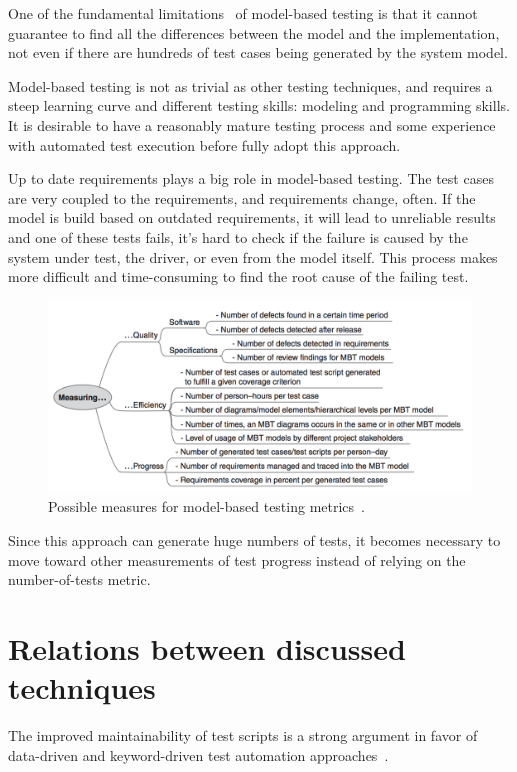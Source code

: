 One of the fundamental limitations~\cite{1200168} of model-based testing is that it cannot guarantee to find all the differences between the model and the implementation, not even if there are hundreds of test cases being generated by the system model.

Model-based testing is not as trivial as other testing techniques, and requires a steep learning curve and different testing skills: modeling and programming skills. It is desirable to have a reasonably mature testing process and some experience with automated test execution before fully adopt this approach.

Up to date requirements plays a big role in model-based testing. The test cases are very coupled to the requirements, and requirements change, often. If the model is build based on outdated requirements, it will lead to unreliable results and one of these tests fails, it's hard to check if the failure is caused by the system under test, the driver, or even from the model itself. This process makes more difficult and time-consuming to find the root cause of the failing test.

\begin{figure}[!htb]
\centering
\includegraphics[scale=0.5]{metrics.png}
\caption{Possible measures for model-based testing metrics~\cite{Kramer2016}.} \label{fig:metrics}
\end{figure}

Since this approach can generate huge numbers of tests, it becomes necessary to move toward other measurements of test progress instead of relying on the number-of-tests metric.

\section{Relations between discussed techniques}

The improved maintainability of test scripts is a strong argument in favor of
data-driven and keyword-driven test automation approaches~\cite{Kramer2016}.

